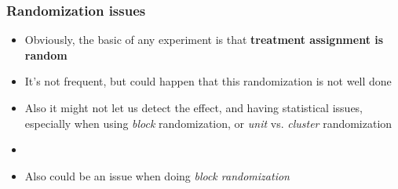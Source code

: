 \documentclass[aspectratio=43]{beamer}
\begin{document}
%
%

\begin{frame}
\frametitle{Randomization issues}
\centering

\begin{itemize}
  \item Obviously, the basic of any experiment is that \textbf{treatment assignment is random}
  \item It's not frequent, but could happen that this randomization is not well done
  \item Also it might not let us detect the effect, and having statistical issues, especially when using \textit{block} randomization, or \textit{unit} vs. \textit{cluster} randomization
  \item[]
  \item Also could be an issue when doing \textit{block randomization}
\end{itemize}

\end{frame}
\end{document}
